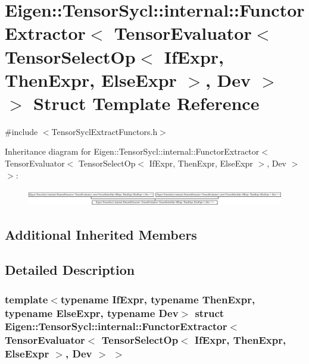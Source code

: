 \hypertarget{struct_eigen_1_1_tensor_sycl_1_1internal_1_1_functor_extractor_3_01_tensor_evaluator_3_01_tensor0670c30e8e5682c1a125c6d24db55784}{}\section{Eigen\+:\+:Tensor\+Sycl\+:\+:internal\+:\+:Functor\+Extractor$<$ Tensor\+Evaluator$<$ Tensor\+Select\+Op$<$ If\+Expr, Then\+Expr, Else\+Expr $>$, Dev $>$ $>$ Struct Template Reference}
\label{struct_eigen_1_1_tensor_sycl_1_1internal_1_1_functor_extractor_3_01_tensor_evaluator_3_01_tensor0670c30e8e5682c1a125c6d24db55784}


{\ttfamily \#include $<$Tensor\+Sycl\+Extract\+Functors.\+h$>$}

Inheritance diagram for Eigen\+:\+:Tensor\+Sycl\+:\+:internal\+:\+:Functor\+Extractor$<$ Tensor\+Evaluator$<$ Tensor\+Select\+Op$<$ If\+Expr, Then\+Expr, Else\+Expr $>$, Dev $>$ $>$\+:\begin{figure}[H]
\begin{center}
\leavevmode
\includegraphics[height=0.747664cm]{struct_eigen_1_1_tensor_sycl_1_1internal_1_1_functor_extractor_3_01_tensor_evaluator_3_01_tensor0670c30e8e5682c1a125c6d24db55784}
\end{center}
\end{figure}
\subsection*{Additional Inherited Members}


\subsection{Detailed Description}
\subsubsection*{template$<$typename If\+Expr, typename Then\+Expr, typename Else\+Expr, typename Dev$>$\newline
struct Eigen\+::\+Tensor\+Sycl\+::internal\+::\+Functor\+Extractor$<$ Tensor\+Evaluator$<$ Tensor\+Select\+Op$<$ If\+Expr, Then\+Expr, Else\+Expr $>$, Dev $>$ $>$}

